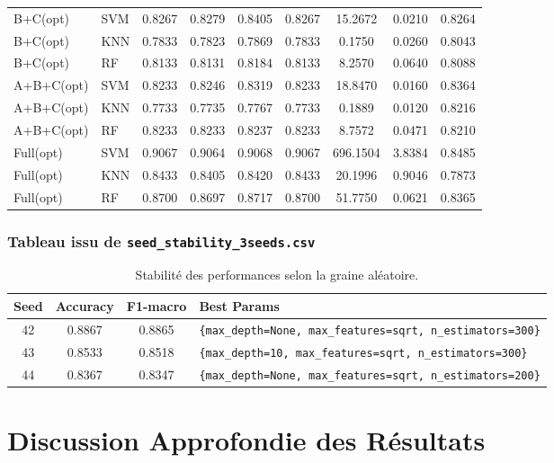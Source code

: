 \documentclass[12pt,a4paper]{article}
\newcommand{\code}[1]{\texttt{#1}}
\begin{document}
\begin{table}[ht]
{\begin{tabular}{l l c c c c c c c}
    B+C(opt) & SVM & 0.8267 & 0.8279 & 0.8405 & 0.8267 & 15.2672 & 0.0210 & 0.8264 \\
    B+C(opt) & KNN & 0.7833 & 0.7823 & 0.7869 & 0.7833 & 0.1750 & 0.0260 & 0.8043 \\
    B+C(opt) & RF & 0.8133 & 0.8131 & 0.8184 & 0.8133 & 8.2570 & 0.0640 & 0.8088 \\
    A+B+C(opt) & SVM & 0.8233 & 0.8246 & 0.8319 & 0.8233 & 18.8470 & 0.0160 & 0.8364 \\
    A+B+C(opt) & KNN & 0.7733 & 0.7735 & 0.7767 & 0.7733 & 0.1889 & 0.0120 & 0.8216 \\
    A+B+C(opt) & RF & 0.8233 & 0.8233 & 0.8237 & 0.8233 & 8.7572 & 0.0471 & 0.8210 \\
    Full(opt) & SVM & 0.9067 & 0.9064 & 0.9068 & 0.9067 & 696.1504 & 3.8384 & 0.8485 \\
    Full(opt) & KNN & 0.8433 & 0.8405 & 0.8420 & 0.8433 & 20.1996 & 0.9046 & 0.7873 \\
    Full(opt) & RF & 0.8700 & 0.8697 & 0.8717 & 0.8700 & 51.7750 & 0.0621 & 0.8365 \\
    \bottomrule
    \end{tabular}%
    }
    \end{table}

    \subsubsection{Tableau issu de \texttt{seed\_stability\_3seeds.csv}}
    \begin{table}[ht]
    \centering
    \caption{Stabilité des performances selon la graine aléatoire.}
    \label{tab:csv_seed_stability}
    \small
    \begin{tabular}{c c c l}
    \toprule
    Seed & Accuracy & F1-macro & Best Params \\
    \midrule
    42 & 0.8867 & 0.8865 & \code{\{max\_depth=None, max\_features=sqrt, n\_estimators=300\}} \\
    43 & 0.8533 & 0.8518 & \code{\{max\_depth=10, max\_features=sqrt, n\_estimators=300\}} \\
    44 & 0.8367 & 0.8347 & \code{\{max\_depth=None, max\_features=sqrt, n\_estimators=200\}} \\
    \bottomrule
    \end{tabular}
    \end{table}

    \section{Discussion Approfondie des Résultats}
\end{document}
